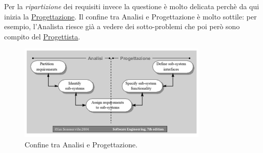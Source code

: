 		Per la \textit{ripartizione} dei requisiti invece la questione è molto delicata perchè da qui inizia la \underline{\hyperref[progettazione]{Progettazione}}. Il confine tra Analisi e Progettazione è molto sottile: per esempio, l'Analista riesce già a vedere dei sotto-problemi che poi però sono compito del \underline{\hyperref[progettista]{Progettista}}.

		\begin{figure}[H]
			\centering
			\includegraphics[width=0.8\textwidth]{img/conf}
			\caption{Confine tra Analisi e Progettazione.}
		\end{figure}

